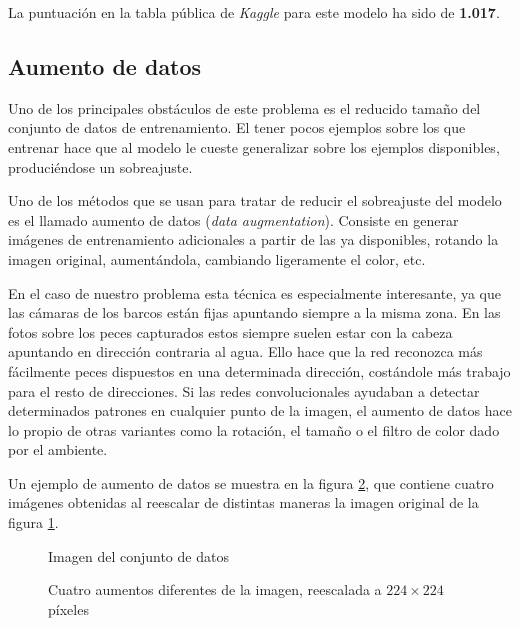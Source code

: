 La puntuación en la tabla pública de \textit{Kaggle} para este modelo ha sido
de \textbf{1.017}.


\subsection{Aumento de datos}

Uno de los principales obstáculos de este problema es el reducido tamaño del conjunto de datos de entrenamiento. El tener pocos ejemplos sobre los que entrenar hace que al modelo le cueste generalizar sobre los ejemplos disponibles, produciéndose un sobreajuste.

Uno de los métodos que se usan para tratar de reducir el sobreajuste del modelo es el llamado aumento de datos (\textit{data augmentation}). Consiste en generar imágenes de entrenamiento adicionales a partir de las ya disponibles, rotando la imagen original, aumentándola, cambiando ligeramente el color, etc.

En el caso de nuestro problema esta técnica es especialmente interesante, ya
que las cámaras de los barcos están fijas apuntando siempre a la misma zona. En
las fotos sobre los peces capturados estos siempre suelen estar con la cabeza
apuntando en dirección contraria al agua. Ello hace que la red reconozca más
fácilmente peces dispuestos en una determinada dirección, costándole más
trabajo para el resto de direcciones. Si las redes convolucionales ayudaban a
detectar determinados patrones en cualquier punto de la imagen, el aumento de
datos hace lo propio de otras variantes como la rotación, el tamaño o el filtro
de color dado por el ambiente.

Un ejemplo de aumento de datos se muestra en la figura \ref{augmentations}, que contiene cuatro imágenes obtenidas al reescalar de distintas maneras la imagen original de la figura \ref{aug-original}.

\begin{figure}
    \caption{Imagen del conjunto de datos}
\label{aug-original}
\end{figure}

\begin{figure}
    \caption{Cuatro aumentos diferentes de la imagen, reescalada a $224\times224$ píxeles}
\label{augmentations}
  \makebox[\textwidth]{\texttt{[image: au1]}}
  \makebox[\textwidth]{\texttt{[image: au3]}}
  \makebox[\textwidth]{\texttt{[image: au2]}}
  \makebox[\textwidth]{\texttt{[image: au4]}}
\end{figure}

